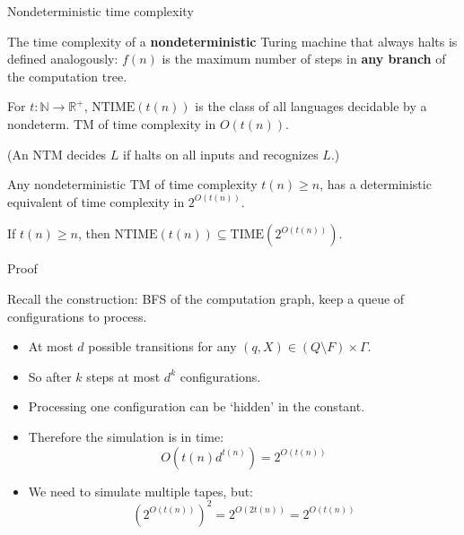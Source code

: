 \documentclass[handout]{beamer}
\begin{document}
\begin{frame}{Nondeterministic time complexity}
    
    The \alert{time complexity} of a \textbf{nondeterministic} Turing machine that always halts is defined analogously: $f(n)$ is the maximum number of steps in \textbf{any branch} of the computation tree.
    
    \begin{definition}
        For $t:\mathbb{N}\to \mathbb{R}^+$, \alert{$\mathrm{NTIME}(t(n))$} is the class of all languages decidable by a nondeterm. TM of time complexity in $O(t(n))$.
    \end{definition}
    \vspace{-6pt}
    (An NTM \alert{decides} $L$ if halts on all inputs and recognizes $L$.)

    \smallskip

    \begin{theorem}        
    Any nondeterministic TM of time complexity $t(n)\geq n$, has a deterministic equivalent of time complexity in $2^{O(t(n))}$.
    \end{theorem}

    \begin{corollary}
        If $t(n)\geq n$, then $\mathrm{NTIME}(t(n))\subseteq \mathrm{TIME}(2^{O(t(n))})$.
    \end{corollary}
    
\end{frame}


\begin{frame}{Proof}

    Recall the construction: BFS of the computation graph, keep a queue of configurations to process.
    \begin{itemize}
        \item At most $d$ possible transitions for any $(q,X)\in (Q\setminus F)\times \Gamma$. 
        \item So after $k$ steps at most $d^k$ configurations.
        \item Processing one configuration can be `hidden' in the constant.
        \item Therefore the simulation is in time:
        $$
        O(t(n)d^{t(n)})=2^{O(t(n))}
        $$
        \item We need to simulate multiple tapes, but: 
        $$
        (2^{O(t(n))})^2=2^{O(2t(n))}=2^{O(t(n))}
        $$

        \vspace{-12pt}
        \hfill\qedsymbol
    \end{itemize}

\end{frame}
\end{document}
